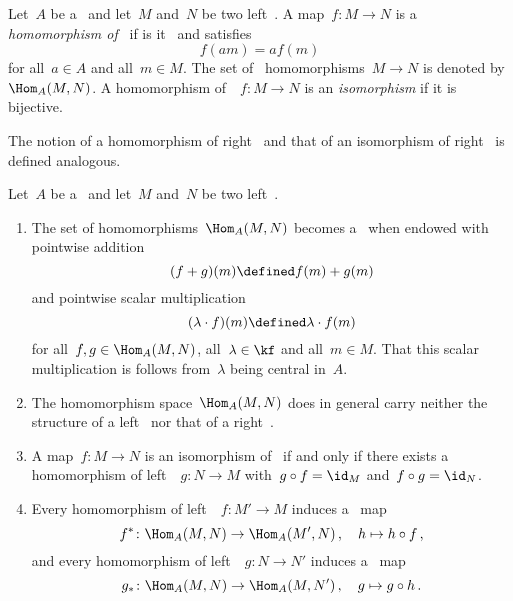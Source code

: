 \begin{definition}
  Let~$A$ be a~{\kalg} and let~$M$ and~$N$ be two left~{}.
  A map~$f \colon M \to N$ is a \emph{homomorphism of~{}} if is it~{\klin} and satisfies
  \[
      f(am)
    = a f(m)
  \]
  for all~$a \in A$ and all~$m \in M$.
  The set of~{} homomorphisms~$M \to N$ is denoted by~$\Hom_A(M,N)$.
  A homomorphism of~{}~$f \colon M \to N$ is an \emph{isomorphism} if it is bijective.
  
  The notion of a homomorphism of right~{} and that of an isomorphism of right~{} is defined analogous.
\end{definition}


\begin{remark}
  Let~$A$ be a~{\kalg} and let~$M$ and~$N$ be two left~{}.
  \begin{enumerate}
    \item
      The set of homomorphisms~$\Hom_A(M,N)$ becomes a~{\module{$\kf$}} when endowed with pointwise addition
      \[
                  (f + g)(m)
        \defined  f(m) + g(m)
      \]
      and pointwise scalar multiplication
      \[
                  (\lambda \cdot f)(m)
        \defined  \lambda \cdot f(m)
      \]
      for all~$f, g \in \Hom_A(M,N)$, all~$\lambda \in \kf$ and all~$m \in M$.
      That this scalar multiplication is {\welldef} follows from~$\lambda$ being central in~$A$.
    \item
      The homomorphism space~$\Hom_A(M,N)$ does in general carry neither the structure of a left~{} nor that of a right~{}.
    \item
      A map~$f \colon M \to N$ is an isomorphism of~{} if and only if there exists a homomorphism of left~{}~$g \colon N \to M$ with~$g \circ f = \id_M$ and~$f \circ g = \id_N$.
    \item
      Every homomorphism of left~{}~$f \colon M' \to M$ induces a~{\klin} map
      \[
                f^*
        \colon  \Hom_A(M, N)
        \to     \Hom_A(M', N) \,,
        \quad   h
        \mapsto h \circ f \,,
      \]
      and every homomorphism of left~{}~$g \colon N \to N'$ induces a~{\klin} map
      \[
                g_*
        \colon  \Hom_A(M, N)
        \to     \Hom_A(M, N') \,,
        \quad   g
        \mapsto g \circ h \,.
      \]
  \end{enumerate}
\end{remark}


